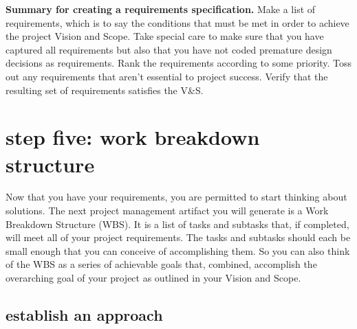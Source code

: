 \documentclass[12pt,oneside]{book}
\begin{document}
\hfill
\begin{mdframed}[everyline=true]
\textbf{Summary for creating a requirements specification.} Make a list of requirements, which is to say the conditions that must be met in order to achieve the project Vision and Scope. Take special care to make sure that you have captured all requirements but also that you have not coded premature design decisions as requirements. Rank the requirements according to some priority. Toss out any requirements that aren't essential to project success. Verify that the resulting set of requirements satisfies the V\&S.
\end{mdframed}

\newpage
{}
\section*{step five: work breakdown structure}
\label{scrivauto:28}

Now that you have your requirements, you are permitted to start thinking about solutions. The next project management artifact you will generate is a Work Breakdown Structure (WBS). It is a list of tasks and subtasks that, if completed, will meet all of your project requirements. The tasks and subtasks should each be small enough that you can conceive of accomplishing them. So you can also think of the WBS as a series of achievable goals that, combined, accomplish the overarching goal of your project as outlined in your Vision and Scope.

\subsection*{establish an approach}
\label{scrivauto:29}
\end{document}
